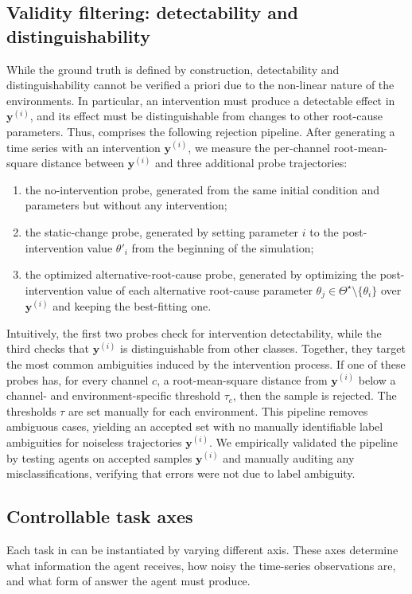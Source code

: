 \subsection{Validity filtering: detectability and distinguishability}
\label{sec:detectability}
While the ground truth is defined by construction, detectability and distinguishability cannot be verified a priori due to the non-linear nature of the environments. 
In particular, an intervention must produce a detectable effect in \(\mathbf{y}^{(i)}\), and its effect must be distinguishable from changes to other root-cause parameters.
Thus, \name{} comprises the following rejection pipeline.
After generating a time series with an intervention \(\mathbf{y}^{(i)}\), we measure the per-channel root-mean-square distance between \(\mathbf{y}^{(i)}\) and three additional probe trajectories:
\begin{enumerate}[leftmargin=*,topsep=3pt,nosep]
    \item the no-intervention probe, generated from the same initial condition and parameters but without any intervention;
    \item the static-change probe, generated by setting parameter \(i\) to the post-intervention value \(\theta'_i\) from the beginning of the simulation;
    \item the optimized alternative-root-cause probe, generated by optimizing the post-intervention value of each alternative root-cause parameter \(\theta_j \in \Theta^\star \setminus \{\theta_i\}\) over \(\mathbf{y}^{(i)}\) and keeping the best-fitting one.
\end{enumerate}
Intuitively, the first two probes check for intervention detectability, while the third checks that \(\mathbf{y}^{(i)}\) is distinguishable from other classes. Together, they target the most common ambiguities induced by the \name{} intervention process.
If one of these probes has, for every channel \(c\), a root-mean-square distance from \(\mathbf{y}^{(i)}\) below a channel- and environment-specific threshold \(\tau_c\), then the sample is rejected.
The thresholds \(\tau\) are set manually for each environment.
This pipeline removes ambiguous cases, yielding an accepted set with no manually identifiable label ambiguities for noiseless trajectories \(\mathbf{y}^{(i)}\).
We empirically validated the pipeline by testing agents on accepted samples \(\mathbf{y}^{(i)}\) and manually auditing any misclassifications, verifying that errors were not due to label ambiguity.

\subsection{Controllable task axes}
Each task in \name{} can be instantiated by varying different axis.
These axes determine what information the agent receives, how noisy the time-series observations are, and what form of answer the agent must produce.
